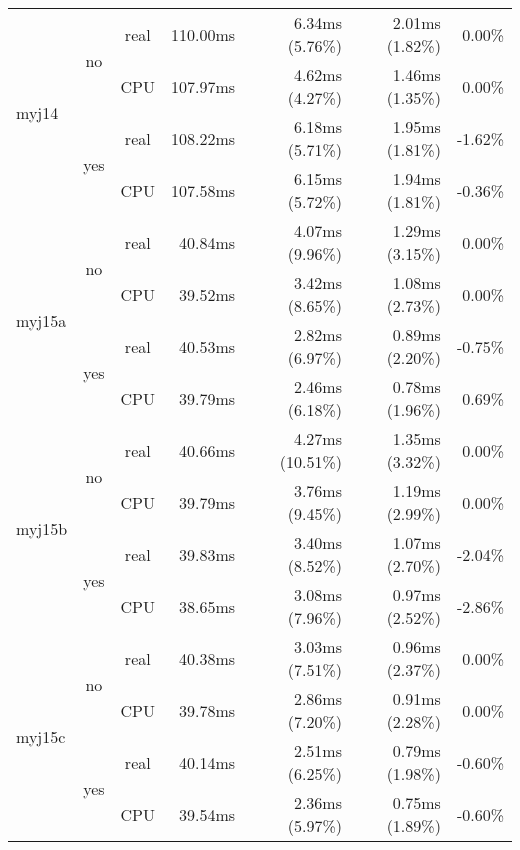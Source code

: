 \documentclass[en]{pracamgr}
\begin{document}
\begin{small}
\begin{longtable}{|l|c|c|r|r|r|r|}
\hline
\multirow{4}{*}{myj14}    & \multirow{2}{*}{no}  & real & 110.00ms & 6.34ms (5.76\%) & 2.01ms (1.82\%) & 0.00\% \\*
                          &                      & CPU  & 107.97ms & 4.62ms (4.27\%) & 1.46ms (1.35\%) & 0.00\% \\*
                          \cline{2-7}
                          & \multirow{2}{*}{yes} & real & 108.22ms & 6.18ms (5.71\%) & 1.95ms (1.81\%) & -1.62\% \\*
                          &                      & CPU  & 107.58ms & 6.15ms (5.72\%) & 1.94ms (1.81\%) & -0.36\% \\
\hline
\multirow{4}{*}{myj15a}   & \multirow{2}{*}{no}  & real & 40.84ms & 4.07ms (9.96\%) & 1.29ms (3.15\%) & 0.00\% \\*
                          &                      & CPU  & 39.52ms & 3.42ms (8.65\%) & 1.08ms (2.73\%) & 0.00\% \\*
                          \cline{2-7}
                          & \multirow{2}{*}{yes} & real & 40.53ms & 2.82ms (6.97\%) & 0.89ms (2.20\%) & -0.75\% \\*
                          &                      & CPU  & 39.79ms & 2.46ms (6.18\%) & 0.78ms (1.96\%) & 0.69\% \\
\hline
\multirow{4}{*}{myj15b}   & \multirow{2}{*}{no}  & real & 40.66ms & 4.27ms (10.51\%) & 1.35ms (3.32\%) & 0.00\% \\*
                          &                      & CPU  & 39.79ms & 3.76ms (9.45\%) & 1.19ms (2.99\%) & 0.00\% \\*
                          \cline{2-7}
                          & \multirow{2}{*}{yes} & real & 39.83ms & 3.40ms (8.52\%) & 1.07ms (2.70\%) & -2.04\% \\*
                          &                      & CPU  & 38.65ms & 3.08ms (7.96\%) & 0.97ms (2.52\%) & -2.86\% \\
\hline
\multirow{4}{*}{myj15c}   & \multirow{2}{*}{no}  & real & 40.38ms & 3.03ms (7.51\%) & 0.96ms (2.37\%) & 0.00\% \\*
                          &                      & CPU  & 39.78ms & 2.86ms (7.20\%) & 0.91ms (2.28\%) & 0.00\% \\*
                          \cline{2-7}
                          & \multirow{2}{*}{yes} & real & 40.14ms & 2.51ms (6.25\%) & 0.79ms (1.98\%) & -0.60\% \\*
                          &                      & CPU  & 39.54ms & 2.36ms (5.97\%) & 0.75ms (1.89\%) & -0.60\% \\

\end{longtable}
\end{small}
\end{document}
